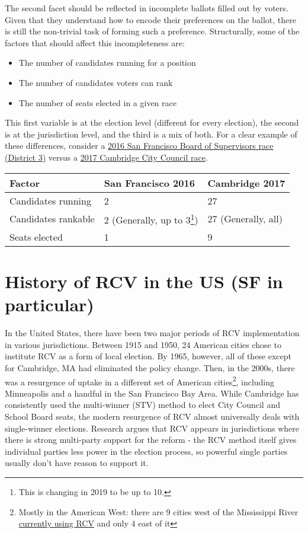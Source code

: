 \documentclass[12pt,twoside]{reedthesis}
\theoremstyle{definition}
\theoremstyle{definition}
\theoremstyle{definition}
\theoremstyle{remark}
\begin{document}
The second facet should be reflected in incomplete ballots filled out by
voters. Given that they understand how to encode their preferences on
the ballot, there is still the non-trivial task of forming such a
preference. Structurally, some of the factors that should affect this
incompleteness are:
\begin{itemize}
\item
  The number of candidates running for a position
\item
  The number of candidates voters can rank
\item
  The number of seats elected in a given race
\end{itemize}
This first variable is at the election level (different for every
election), the second is at the jurisdiction level, and the third is a
mix of both. For a clear example of these differences, consider a
\href{https://sfelections.org/results/20161108/data/20161206/d3/20161206_d3.pdf}{2016
San Francisco Board of Supervisors race (District 3)} versus a
\href{https://www.cambridgema.gov/election2017/Council\%20Order\%20Round.htm}{2017
Cambridge City Council race}.
\begin{longtable}[]{@{}lll@{}}
\toprule
Factor & San Francisco 2016 & Cambridge 2017\tabularnewline
\midrule
\endhead
Candidates running & 2 & 27\tabularnewline
Candidates rankable & 2 (Generally, up to 3\footnote{This is changing in
  2019 to be up to 10.}) & 27 (Generally, all)\tabularnewline
Seats elected & 1 & 9\tabularnewline
\bottomrule
\end{longtable}
\hypertarget{history-of-rcv-in-the-us-sf-in-particular}{%
\section{History of RCV in the US (SF in
particular)}\label{history-of-rcv-in-the-us-sf-in-particular}}

In the United States, there have been two major periods of RCV
implementation in various jurisdictions. Between 1915 and 1950, 24
American cities chose to institute RCV as a form of local election. By
1965, however, all of these except for Cambridge, MA had eliminated the
policy change. Then, in the 2000s, there was a resurgence of uptake in a
different set of American cities\footnote{Mostly in the American West:
  there are 9 cities west of the Mississippi River
  \href{https://www.fairvote.org/where_is_ranked_choice_voting_used}{currently
  using RCV} and only 4 east of it}, including Minneapolis and a handful
in the San Francisco Bay Area. While Cambridge has consistently used the
multi-winner (STV) method to elect City Council and School Board seats,
the modern resurgence of RCV almost universally deals with single-winner
elections. Research argues that RCV appears in jurisdictions where there
is strong multi-party support for the reform - the RCV method itself
gives individual parties less power in the election process, so powerful
single parties usually don't have reason to support it.
\end{document}
